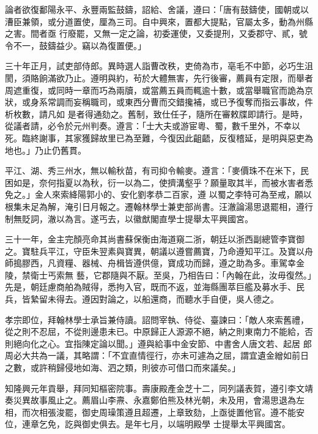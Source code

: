 \begin{pinyinscope}
 論者欲復鄱陽永平、永豐兩監鼓鑄，詔給、舍議，遵曰：「唐有鼓鑄使，國朝或以漕臣兼領，或分道置使，厘為三司。自中興來，置都大提點，官屬太多，動為州縣之害。間者亟
 行廢罷，又無一定之論，初委運使，又委提刑，又委郡守、貳，號令不一，鼓鑄益少。竊以為復置便。」



 三十年正月，試吏部侍郎。異時選人詣曹改秩，吏倚為市，亳毛不中節，必巧生沮閡，須賂餉滿欲乃止。遵明與約，茍於大體無害，先行後審，薦員有定限，而舉者周遮重復，或同時一章而巧為兩牘，或當薦五員而輒逾十數，或當舉職官而詭為京狀，或身系常調而妄稱職司，或東西分曹而交錯攙補，或已予復奪而指云事故，件析枚數，請凡如
 是者得通劾之。舊制，致仕任子，隨所在審敕牒即請行。是時，從議者請，必令於元州判奏。遵言：「士大夫或游宦粵、蜀，數千里外，不幸以死。臨終謝事，其家獲歸故里已為至難，今復因此齟齬，反復稽延，是明與惡吏為地也。」乃止仍舊貫。



 平江、湖、秀三州水，無以輸秋苗，有司抑令輸麥。遵言：「麥價珠不在米下，民困如是，奈何指夏以為秋，衍一以為二，使擠溝壑乎？願量取其半，而被水害者悉免之。」金人來索絳陽郭小的、安化劉孝恭二百家，遵
 以蜀之李特可為至戒，願以根集未足為解，淹引日月報之。遷翰林學士兼吏部尚書。汪澈論湯思退罷相，遵行制無貶詞，澈以為言。遂丐去，以徽猷閣直學士提舉太平興國宮。



 三十一年，金主完顏亮命其尚書蘇保衡由海道窺二浙，朝廷以浙西副總管李寶御之。寶駐兵平江，守臣朱翌素與寶異，朝議以遵嘗薦寶，乃命遵知平江。及寶以舟師搗膠西，凡資糧、器械、舟楫皆遵供億，寶成功而歸，遵之助為多。車駕幸金陵，禁衛士丐索無
 藝，它郡隨與不厭。至吳，乃相告曰：「內翰在此，汝毋復然。」先是，朝廷慮商舶為賊得，悉拘入官，既而不返，並海縣團萃巨艦及募水手、民兵，皆縶留未得去。遵因對論之，以船還商，而聽水手自便，吳人德之。



 孝宗即位，拜翰林學士承旨兼侍讀。詔問宰執、侍從、臺諫曰：「敵人來索舊禮，從之則不忍屈，不從則邊患未已。中原歸正人源源不絕，納之則東南力不能給，否則絕向化之心。宜指陳定論以聞。」遵與給事中金安節、中書舍人唐文若、起居
 郎周必大共為一議，其略謂：「不宜直情徑行，亦未可遽為之屈，謂宜遺金繒如前日之數，或許稍歸侵地如海、泗之類，則彼亦可借口而來議矣。」



 知隆興元年貢舉，拜同知樞密院事。壽康殿產金芝十二，同列議表賀，遵引李文靖奏災異故事風止之。薦眉山李燾、永嘉鄭伯熊及林光朝，未及用，會湯思退為左相，而次相張浚罷，御史周璪策遵且超遷，上章致劾，上亟徙置他官。遵不能安位，連章乞免，訖與御史俱去。是年七月，以端明殿學
 士提舉太平興國宮。




\end{pinyinscope}
